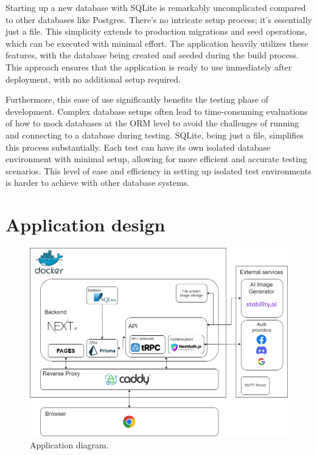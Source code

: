 Starting up a new database with SQLite is remarkably uncomplicated compared to other databases like Postgres. There's no intricate setup process; it's essentially just a file. This simplicity extends to production migrations and seed operations, which can be executed with minimal effort. The application heavily utilizes these features, with the database being created and seeded during the build process. This approach ensures that the application is ready to use immediately after deployment, with no additional setup required.

Furthermore, this ease of use significantly benefits the testing phase of development. Complex database setups often lead to time-consuming evaluations of how to mock databases at the ORM level to avoid the challenges of running and connecting to a database during testing. SQLite, being just a file, simplifies this process substantially. Each test can have its own isolated database environment with minimal setup, allowing for more efficient and accurate testing scenarios. This level of ease and efficiency in setting up isolated test environments is harder to achieve with other database systems.\cite{why-sqlite}

\section{Application design}

\begin{figure}
    \centering
    \includegraphics[width=\textwidth]{text/img/low-level.png}
    \caption{Application diagram.}
    \label{fig:low-level}
\end{figure}

